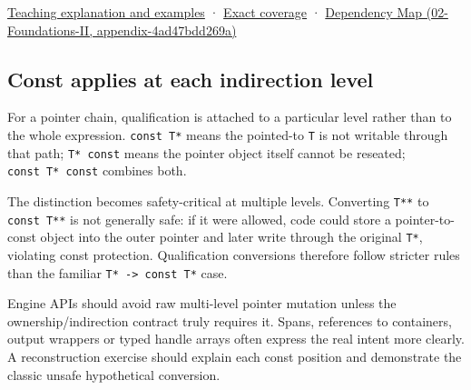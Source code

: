\hyperref[01-foundations-i-ch003-read-only-is-a-path-not-an-ownership-or-synchronization-promise]{Teaching explanation and examples} · \hyperref[appendix-fd090d982a15-m008---parts-113-126]{Exact coverage} · \href{../02-Foundations-II/main.pdf\#nameddest=appendix-4ad47bdd269a}{Dependency Map (02-Foundations-II, appendix-4ad47bdd269a)}

\subsection{Const applies at each indirection level}\label{appendix-5e1a7561cd98-const-applies-at-each-indirection-level}

For a pointer chain, qualification is attached to a particular level rather than to the whole expression. \texttt{const\ T*} means the pointed-to \texttt{T} is not writable through that path; \texttt{T*\ const} means the pointer object itself cannot be reseated; \texttt{const\ T*\ const} combines both.

The distinction becomes safety-critical at multiple levels. Converting \texttt{T**} to \texttt{const\ T**} is not generally safe: if it were allowed, code could store a pointer-to-const object into the outer pointer and later write through the original \texttt{T*}, violating const protection. Qualification conversions therefore follow stricter rules than the familiar \texttt{T*\ -\textgreater{}\ const\ T*} case.

Engine APIs should avoid raw multi-level pointer mutation unless the ownership/indirection contract truly requires it. Spans, references to containers, output wrappers or typed handle arrays often express the real intent more clearly. A reconstruction exercise should explain each const position and demonstrate the classic unsafe hypothetical conversion.
